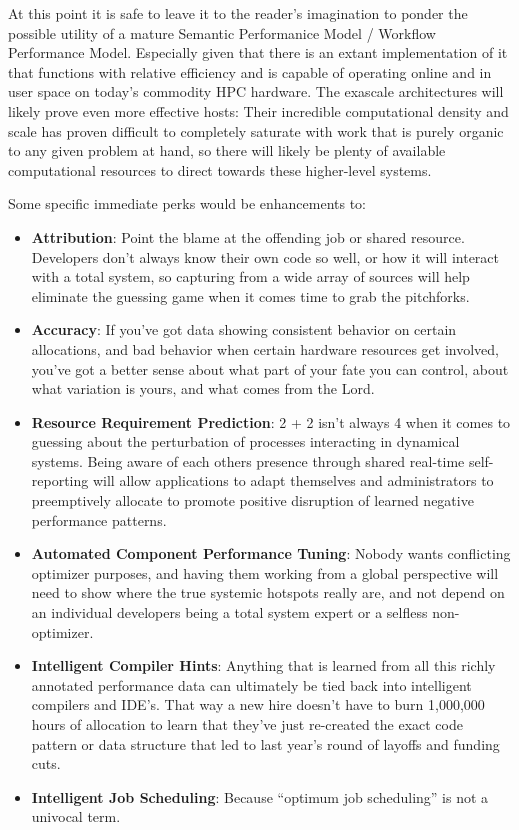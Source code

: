 At this point it is safe to leave it to the reader's imagination to
ponder the possible utility of a mature Semantic Performanice Model /
Workflow Performance Model.
%
Especially given that there is an extant implementation of it that
functions with relative efficiency and is capable of operating online
and in user space on today's commodity HPC hardware.
%
The exascale architectures will likely prove even more effective
hosts: Their incredible computational density and scale has proven
difficult to completely saturate with work that is purely organic to
any given problem at hand, so there will likely be plenty of available
computational resources to direct towards these higher-level systems.

Some specific immediate perks would be enhancements to:
%
\begin{itemize}
    \item \textbf{Attribution}: Point the blame at the offending job
      or shared resource.
      Developers don't always know their own code so well, or how it
      will interact with a total system, so capturing from a wide
      array of sources will help eliminate the guessing game when it
      comes time to grab the pitchforks.
    \item \textbf{Accuracy}: If you've got data showing consistent behavior on
      certain allocations, and bad behavior when certain hardware resources
      get involved, you've got a better sense about what part of your
      fate you can control, about what variation is yours, and what comes
      from the Lord.
    \item \textbf{Resource Requirement Prediction}: 2 + 2 isn't always
      4 when it comes to guessing about the perturbation of processes
      interacting in dynamical systems.
      Being aware of each others presence through shared real-time
      self-reporting will allow applications to adapt themselves and
      administrators to preemptively allocate to promote positive
      disruption of learned negative performance patterns.
    \item \textbf{Automated Component Performance Tuning}: Nobody
      wants conflicting optimizer purposes, and having them working
      from a global perspective will need to show where the true
      systemic hotspots really are, and not depend on an individual
      developers being a total system expert or a selfless
      non-optimizer.
\item \textbf{Intelligent Compiler Hints}: Anything that is learned from all
      this richly annotated performance data can ultimately be tied back
      into intelligent compilers and IDE's.
      That way a new hire doesn't have to burn 1,000,000 hours of
      allocation to learn that they've just re-created the exact code
      pattern or data structure that led to last year's round of
      layoffs and funding cuts.
    \item \textbf{Intelligent Job Scheduling}: Because ``optimum job
      scheduling'' is not a univocal term.
\end{itemize}

